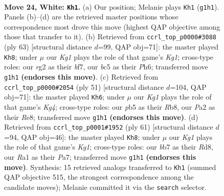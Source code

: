 \documentclass[11pt]{article}
\begin{document}
\clearpage

\begin{figure}[p]\centering
\begin{subfigure}{0.46\textwidth}\centering
\resizebox{\linewidth}{!}{%
\newchessgame
\chessboard[
  setfen={1n2k3/1b6/8/ppb2p2/8/8/PN2PPr1/R2Q1RK1 w - - 0 24},
  showmover=false,
  pgfstyle=straightmove, color=movearrow, markmove={g1-h1}
]}
\caption{}
\end{subfigure}\hfill
\begin{subfigure}{0.46\textwidth}\centering
\resizebox{\linewidth}{!}{%
\newchessgame
\chessboard[
  setfen={1r1r2k1/5Bp1/3q3p/p7/8/7P/Q4PP1/2bR2K1 b - - 0 32},
  showmover=false,
  pgfstyle=straightmove, color=movearrow, markmove={g8-h8}
]}
\caption{}
\end{subfigure}
\\[4pt]
\begin{subfigure}{0.46\textwidth}\centering
\resizebox{\linewidth}{!}{%
\newchessgame
\chessboard[
  setfen={1r2r3/3B3p/p2p2p1/6k1/1R2n2P/5R2/P1P3P1/6K1 b - - 0 26},
  showmover=false,
  pgfstyle=straightmove, color=movearrow, markmove={g5-h6}
]}
\caption{}
\end{subfigure}\hfill
\begin{subfigure}{0.46\textwidth}\centering
\resizebox{\linewidth}{!}{%
\newchessgame
\chessboard[
  setfen={3r1rk1/p7/2p3Q1/4P3/1p3pp1/8/PPK1B1q1/R7 b - - 2 31},
  showmover=false,
  pgfstyle=straightmove, color=movearrow, markmove={g8-h8}
]}
\caption{}
\end{subfigure}
\caption{\textbf{Move 24, White: \texttt{Kh1}.} (a) Our position; Melanie plays \texttt{Kh1} (\texttt{g1h1}). Panels (b)--(d) are the retrieved master positions whose correspondence most drove this move (highest QAP objective among those that transfer to it). (b) Retrieved from \texttt{ccrl\_top\_p0000\#3088} (ply 63) [structural distance $d$=99, QAP obj=71]: the master played \texttt{Kh8}; under $\mu$ our \emph{Kg1} plays the role of that game's \emph{Kg1}; cross-type roles: our \emph{r}g2 as their \emph{b}f7, our \emph{b}c5 as their \emph{P}h6; transferred move \texttt{g1h1} \textbf{(endorses this move)}. (c) Retrieved from \texttt{ccrl\_top\_p0000\#2054} (ply 51) [structural distance $d$=104, QAP obj=71]: the master played \texttt{Kh6}; under $\mu$ our \emph{Kg1} plays the role of that game's \emph{Kg4}; cross-type roles: our \emph{p}b5 as their \emph{R}b8, our \emph{P}a2 as their \emph{R}e8; transferred move \texttt{g1h1} \textbf{(endorses this move)}. (d) Retrieved from \texttt{ccrl\_top\_p0001\#1952} (ply 61) [structural distance $d$=94, QAP obj=46]: the master played \texttt{Kh8}; under $\mu$ our \emph{Kg1} plays the role of that game's \emph{Kg1}; cross-type roles: our \emph{b}b7 as their \emph{R}d8, our \emph{R}a1 as their \emph{P}a7; transferred move \texttt{g1h1} \textbf{(endorses this move)}. Synthesis: 15 retrieved analogs transferred to \texttt{Kh1} (summed QAP objective 515, the strongest correspondence among the candidate moves); Melanie committed it via the \texttt{search} selector.}
\label{fig:thought-m46}
\end{figure}
\end{document}
